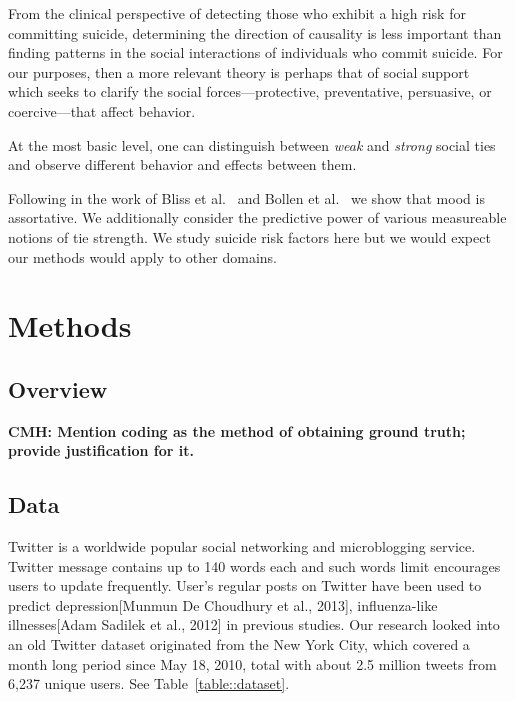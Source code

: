 \documentclass[11pt]{article}
\begin{document}
From the clinical perspective of detecting those who exhibit a high risk for committing suicide, determining the direction of causality is less important than finding patterns in the social interactions of individuals who commit suicide. For our purposes, then a more relevant theory is perhaps that of social support~\cite{wellman1990different} which seeks to clarify the social forces---protective, preventative, persuasive, or coercive---that affect behavior. 

At the most basic level, one can distinguish between \emph{weak} and \emph{strong} social ties and observe different behavior and effects between them.  

Following in the work of Bliss et al.~\cite{coviello2014} and Bollen et al.~\cite{bollen2011happiness} we show that 
mood is assortative. We additionally consider the predictive power of various measureable notions of tie strength.
We study suicide risk factors here but we would expect our methods would apply to other domains.



\section{Methods}
\subsection{Overview}
\textbf{CMH: Mention coding as the method of obtaining ground truth; provide justification for it.}
\subsection{Data}
Twitter is a worldwide popular social networking and microblogging service. Twitter message contains up to 140 words each and such words limit encourages users to update frequently. User's regular posts on Twitter have been used to predict depression[Munmun De Choudhury et al., 2013], influenza-like illnesses[Adam Sadilek et al., 2012] in previous studies. Our research looked into an old Twitter dataset originated from the New York City, which covered a month long period since May 18, 2010, total with about 2.5 million tweets from 6,237 unique users. See Table~\ref{table::dataset}.
\end{document}
